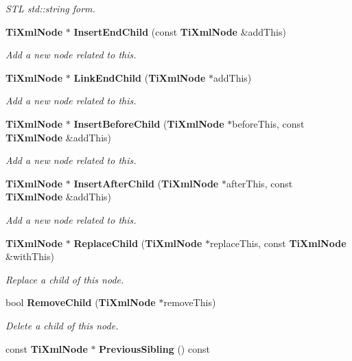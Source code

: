 \begin{CompactItemize}
\begin{CompactList}\small\item\em STL std::string form. \item\end{CompactList}\item 
{\bf Ti\-Xml\-Node} $\ast$ {\bf Insert\-End\-Child} (const {\bf Ti\-Xml\-Node} \&add\-This)
\begin{CompactList}\small\item\em Add a new node related to this. \item\end{CompactList}\item 
{\bf Ti\-Xml\-Node} $\ast$ {\bf Link\-End\-Child} ({\bf Ti\-Xml\-Node} $\ast$add\-This)
\begin{CompactList}\small\item\em Add a new node related to this. \item\end{CompactList}\item 
{\bf Ti\-Xml\-Node} $\ast$ {\bf Insert\-Before\-Child} ({\bf Ti\-Xml\-Node} $\ast$before\-This, const {\bf Ti\-Xml\-Node} \&add\-This)
\begin{CompactList}\small\item\em Add a new node related to this. \item\end{CompactList}\item 
{\bf Ti\-Xml\-Node} $\ast$ {\bf Insert\-After\-Child} ({\bf Ti\-Xml\-Node} $\ast$after\-This, const {\bf Ti\-Xml\-Node} \&add\-This)
\begin{CompactList}\small\item\em Add a new node related to this. \item\end{CompactList}\item 
{\bf Ti\-Xml\-Node} $\ast$ {\bf Replace\-Child} ({\bf Ti\-Xml\-Node} $\ast$replace\-This, const {\bf Ti\-Xml\-Node} \&with\-This)
\begin{CompactList}\small\item\em Replace a child of this node. \item\end{CompactList}\item 
bool {\bf Remove\-Child} ({\bf Ti\-Xml\-Node} $\ast$remove\-This)\label{classTiXmlNode_TiXmlUnknowna37}

\begin{CompactList}\small\item\em Delete a child of this node. \item\end{CompactList}\item 
const {\bf Ti\-Xml\-Node} $\ast$ {\bf Previous\-Sibling} () const\label{classTiXmlNode_TiXmlUnknowna38}


\end{CompactItemize}
